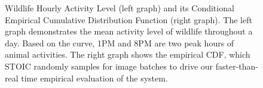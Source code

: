 \begin{figure}
\begin{minipage}{.4\textwidth}
\end{minipage}
\caption{Wildlife Hourly Activity Level (left graph) and its Conditional Empirical Cumulative Distribution Function (right graph). The left graph demonstrates the mean activity level of wildlife throughout a day. Based on the curve, 1PM and 8PM are two peak hours of animal activities.  The right graph shows the empirical CDF, which STOIC randomly samples for image batches to drive our faster-than-real time empirical evaluation of the system.\label{fig:hour_act_and_cdf}}
\end{figure}

